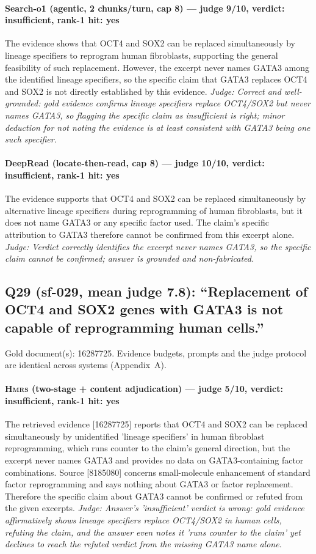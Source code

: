 \documentclass[sigconf, review, anonymous]{acmart}
\begin{document}
\paragraph{Search-o1 (agentic, 2 chunks/turn, cap 8) --- judge 9/10, verdict: insufficient, rank-1 hit: yes}
\noindent The evidence shows that OCT4 and SOX2 can be replaced simultaneously by lineage specifiers to reprogram human fibroblasts, supporting the general feasibility of such replacement. However, the excerpt never names GATA3 among the identified lineage specifiers, so the specific claim that GATA3 replaces OCT4 and SOX2 is not directly established by this evidence.
\noindent\small\textit{Judge: Correct and well-grounded: gold evidence confirms lineage specifiers replace OCT4/SOX2 but never names GATA3, so flagging the specific claim as insufficient is right; minor deduction for not noting the evidence is at least consistent with GATA3 being one such specifier.}
\paragraph{DeepRead (locate-then-read, cap 8) --- judge 10/10, verdict: insufficient, rank-1 hit: yes}
\noindent The evidence supports that OCT4 and SOX2 can be replaced simultaneously by alternative lineage specifiers during reprogramming of human fibroblasts, but it does not name GATA3 or any specific factor used. The claim's specific attribution to GATA3 therefore cannot be confirmed from this excerpt alone.
\noindent\small\textit{Judge: Verdict correctly identifies the excerpt never names GATA3, so the specific claim cannot be confirmed; answer is grounded and non-fabricated.}

\subsection{Q29 (sf-029, mean judge 7.8): ``Replacement of OCT4 and SOX2 genes with GATA3 is not capable of reprogramming human cells.''}
\label{app:q29}
\noindent Gold document(s): 16287725. Evidence budgets, prompts and the judge protocol are identical across systems (Appendix~A).
\paragraph{\textbf{\textsc{Hmrs}} (two-stage + content adjudication) --- judge 5/10, verdict: insufficient, rank-1 hit: yes}
\noindent The retrieved evidence [16287725] reports that OCT4 and SOX2 can be replaced simultaneously by unidentified 'lineage specifiers' in human fibroblast reprogramming, which runs counter to the claim's general direction, but the excerpt never names GATA3 and provides no data on GATA3-containing factor combinations. Source [8185080] concerns small-molecule enhancement of standard factor reprogramming and says nothing about GATA3 or factor replacement. Therefore the specific claim about GATA3 cannot be confirmed or refuted from the given excerpts.
\noindent\small\textit{Judge: Answer's 'insufficient' verdict is wrong: gold evidence affirmatively shows lineage specifiers replace OCT4/SOX2 in human cells, refuting the claim, and the answer even notes it 'runs counter to the claim' yet declines to reach the refuted verdict from the missing GATA3 name alone.}
\end{document}
